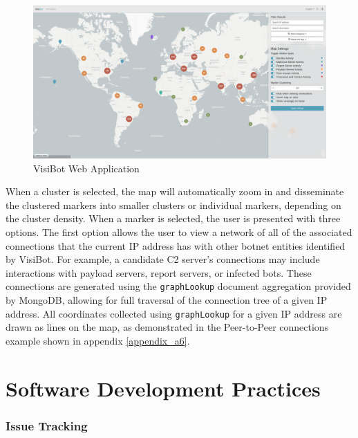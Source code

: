 \begin{figure}[!htb]
    \centering
    \includegraphics[width=0.8\linewidth]{images/visibot_screenshot_cluster.png}
    \caption{VisiBot Web Application}
    \label{fig:visibot_screenshot_cluster} 
\end{figure}

When a cluster is selected, the map will automatically zoom in and disseminate the clustered markers into smaller clusters or individual markers, depending on the cluster density. When a marker is selected, the user is presented with three options. The first option allows the user to view a network of all of the associated connections that the current IP address has with other botnet entities identified by VisiBot. For example, a candidate C2 server's connections may include interactions with payload servers, report servers, or infected bots. These connections are generated using the \texttt{graphLookup} document aggregation \citep{graphLookup} provided by MongoDB, allowing for full traversal of the connection tree of a given IP address. All coordinates collected using \texttt{graphLookup} for a given IP address are drawn as lines on the map, as demonstrated in the Peer-to-Peer connections example shown in appendix \ref{appendix_a6}.




\section{Software Development Practices}

\subsubsection{Issue Tracking}

